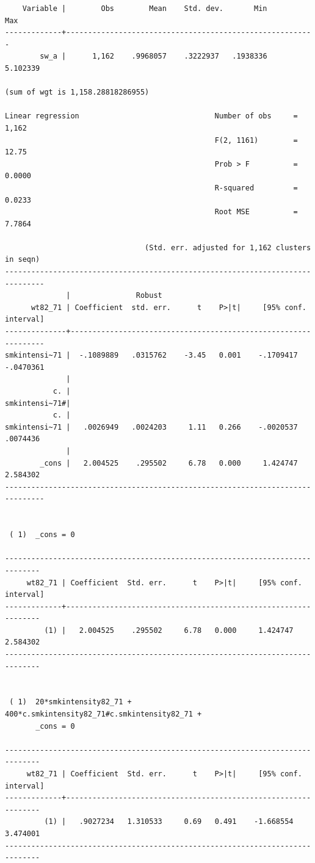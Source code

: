 \documentclass[
  10pt,
]{book}
\begin{document}
\begin{verbatim}
    Variable |        Obs        Mean    Std. dev.       Min        Max
-------------+---------------------------------------------------------
        sw_a |      1,162    .9968057    .3222937   .1938336   5.102339

(sum of wgt is 1,158.28818286955)

Linear regression                               Number of obs     =      1,162
                                                F(2, 1161)        =      12.75
                                                Prob > F          =     0.0000
                                                R-squared         =     0.0233
                                                Root MSE          =     7.7864

                                (Std. err. adjusted for 1,162 clusters in seqn)
-------------------------------------------------------------------------------
              |               Robust
      wt82_71 | Coefficient  std. err.      t    P>|t|     [95% conf. interval]
--------------+----------------------------------------------------------------
smkintensi~71 |  -.1089889   .0315762    -3.45   0.001    -.1709417   -.0470361
              |
           c. |
smkintensi~71#|
           c. |
smkintensi~71 |   .0026949   .0024203     1.11   0.266    -.0020537    .0074436
              |
        _cons |   2.004525    .295502     6.78   0.000     1.424747    2.584302
-------------------------------------------------------------------------------


 ( 1)  _cons = 0

------------------------------------------------------------------------------
     wt82_71 | Coefficient  Std. err.      t    P>|t|     [95% conf. interval]
-------------+----------------------------------------------------------------
         (1) |   2.004525    .295502     6.78   0.000     1.424747    2.584302
------------------------------------------------------------------------------


 ( 1)  20*smkintensity82_71 + 400*c.smkintensity82_71#c.smkintensity82_71 +
       _cons = 0

------------------------------------------------------------------------------
     wt82_71 | Coefficient  Std. err.      t    P>|t|     [95% conf. interval]
-------------+----------------------------------------------------------------
         (1) |   .9027234   1.310533     0.69   0.491    -1.668554    3.474001
------------------------------------------------------------------------------
\end{verbatim}
\end{document}
